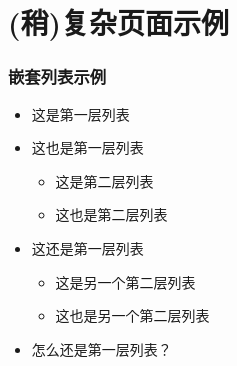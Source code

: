    \section{(稍)复杂页面示例} 
    
    \begin{frame}
        \frametitle{嵌套列表示例}

        \begin{itemize}
            \item 这是第一层列表
            \item 这也是第一层列表
            \begin{itemize} 
                \item 这是第二层列表
                \item 这也是第二层列表
            \end{itemize}
            \item 这还是第一层列表
            \begin{itemize}
                \item 这是另一个第二层列表
                \item 这也是另一个第二层列表
            \end{itemize}
            \item 怎么还是第一层列表？
        \end{itemize}
    \end{frame}

